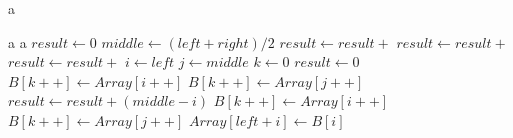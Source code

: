 \documentclass[11pt]{article}
\theoremstyle{theorem}
\theoremstyle{lemma}
\theoremstyle{property}
\theoremstyle{definition}
\theoremstyle{assumption}
\begin{document}
\newpage
    \begin{algorithm}
        \caption{a}
        \begin{algorithmic}[1] 
            \Require a
            \Ensure a
                \State $result \gets 0$
                    \State $middle \gets (left + right) / 2$
                    \State $result \gets result +$ 
                    \State $result \gets result +$ 
                    \State $result \gets result +$ 
                \EndIf
                \State {}
            \EndFunction
            \State
                \State $i\gets left$
                \State $j\gets middle$
                \State $k\gets 0$
                \State $result \gets 0$
                        \State $B[k++]\gets Array[i++]$
                    \Else
                        \State $B[k++] \gets Array[j++]$
                        \State $result \gets result + (middle - i)$
                    \EndIf
                \EndWhile
                    \State $B[k++] \gets Array[i++]$
                \EndWhile
                    \State $B[k++] \gets Array[j++]$
                \EndWhile
                    \State $Array[left + i] \gets B[i]$
                \EndFor
                \State {}
            \EndFunction
        \end{algorithmic}
    \end{algorithm}
\end{document}
